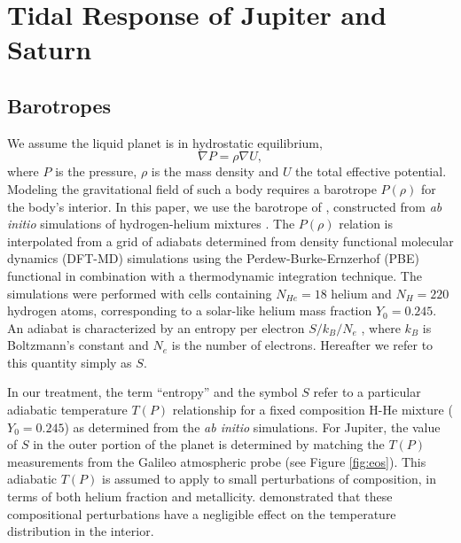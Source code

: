\chapter{Tidal Response of Jupiter and Saturn}\label{chap7}

\section{Barotropes}


We assume the liquid planet is in hydrostatic equilibrium,
%
\begin{equation} \nabla P = \rho \nabla U,     
   \label{eq:hydrostatic2} \end{equation}
%
where $P$ is the pressure, $\rho$ is the mass density and $U$ the total effective
potential. Modeling the gravitational field of such a body requires a barotrope
$P(\rho)$ for the body's interior. In this paper, we use the barotrope of
\citet{hubbard2016}, constructed from \textit{ab initio} simulations of
hydrogen-helium mixtures \citep{militzer2013a,militzer2013b}. The $P(\rho)$ relation
is interpolated from a grid of adiabats determined from density functional 
molecular dynamics (DFT-MD) simulations using the Perdew-Burke-Ernzerhof (PBE) functional
\citep{PBE} in combination with a thermodynamic integration technique. The
simulations were performed with cells containing $N_{He}=18$ helium and $N_{H}=220$
hydrogen atoms, corresponding to a solar-like helium mass fraction $Y_0=0.245$. An
adiabat is characterized by an entropy per electron $S/k_B/N_e$
\citep{militzer2013b}, where $k_B$ is Boltzmann's constant and $N_e$ is the number of
electrons. Hereafter we refer to this quantity simply as $S$.

In our treatment, the term ``entropy'' and the symbol $S$ refer to a particular
adiabatic temperature $T(P)$ relationship for a fixed composition H-He mixture
($Y_0=0.245$) as determined from the \textit{ab initio} simulations.  For Jupiter,
the value of $S$ in the outer portion of the planet is determined by matching the
$T(P)$ measurements from the Galileo atmospheric probe (see Figure \ref{fig:eos}).
This adiabatic $T(P)$ is assumed to apply to small perturbations of composition, in
terms of both helium fraction and metallicity. \citet{hubbard2016} demonstrated that
these compositional perturbations have a negligible effect on the temperature
distribution in the interior.

